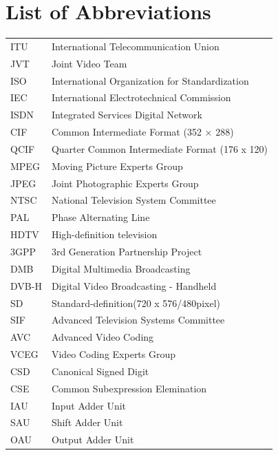 
\chapter*{List of Abbreviations}

\begin{table}[!ht]
\begin{tabular}{p{2cm} l}
ITU & International Telecommunication Union \\
JVT & Joint Video Team \\
ISO & International Organization for Standardization\\
IEC & International Electrotechnical Commission\\
ISDN &Integrated Services Digital Network\\
CIF & Common Intermediate Format (352 × 288) \\
QCIF & Quarter Common Intermediate Format (176 x 120)\\
MPEG & Moving Picture Experts Group\\
JPEG & Joint Photographic Experts Group\\
NTSC & National Television System Committee\\
PAL & Phase Alternating Line\\
HDTV & High-definition television\\
3GPP & 3rd Generation Partnership Project\\
DMB & Digital Multimedia Broadcasting\\
DVB-H & Digital Video Broadcasting - Handheld\\
SD & Standard-definition(720 x 576/480pixel)\\
SIF & Advanced Television Systems Committee\\
AVC & Advanced Video Coding\\
VCEG & Video Coding Experts Group\\
CSD & Canonical Signed Digit \\
CSE & Common Subexpression Elemination \\
IAU & Input Adder Unit \\
SAU & Shift Adder Unit\\
OAU & Output Adder Unit \\
\end{tabular}
\end{table}